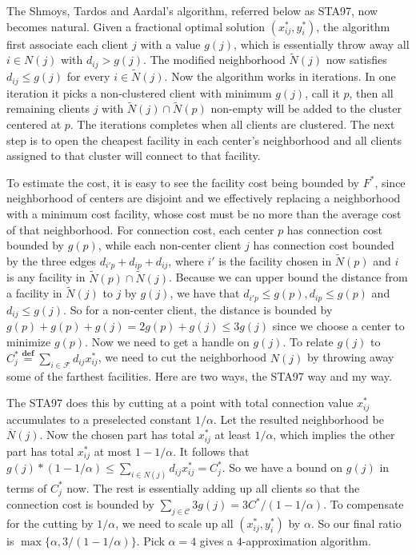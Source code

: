 \documentclass{article}
\newcommand{\fac}{\mathcal{F}}
\newcommand{\cli}{\mathcal{C}}
\newcommand{\wbar}{\overline}
\newcommand{\defeq}{\stackrel{\textbf{def}}{=}}
\begin{document}
The Shmoys, Tardos and Aardal's algorithm, referred below as STA97,
now becomes natural. Given a fractional optimal solution
$(x_{ij}^\ast, y_i^\ast)$, the algorithm first associate each client
$j$ with a value $g(j)$, which is essentially throw away all $i\in
N(j)$ with $d_{ij} > g(j)$. The modified neighborhood $\widetilde
N(j)$ now satisfies $d_{ij} \leq g(j)$ for every $i\in \widetilde
N(j)$. Now the algorithm works in iterations. In one iteration it
picks a non-clustered client with minimum $g(j)$, call it $p$, then
all remaining clients $j$ with $\widetilde N(j)\cap \widetilde N(p)$
non-empty will be added to the cluster centered at $p$. The iterations
completes when all clients are clustered. The next step is to open the
cheapest facility in each center's neighborhood and all clients
assigned to that cluster will connect to that facility.

To estimate the cost, it is easy to see the facility cost being
bounded by $F^\ast$, since neighborhood of centers are disjoint and we
effectively replacing a neighborhood with a minimum cost facility,
whose cost must be no more than the average cost of that
neighborhood. For connection cost, each center $p$ has connection cost
bounded by $g(p)$, while each non-center client $j$ has connection
cost bounded by the three edges $d_{i' p} + d_{ip} + d_{ij}$, where
$i'$ is the facility chosen in $\widetilde N(p)$ and $i$ is any
facility in $\widetilde N(p)\cap \widetilde N(j)$. Because we can
upper bound the distance from a facility in $\widetilde N(j)$ to $j$
by $g(j)$, we have that $d_{i' p} \leq g(p), d_{ip} \leq g(p)$ and
$d_{ij} \leq g(j)$. So for a non-center client, the distance is
bounded by $g(p) + g(p) + g(j) = 2g(p) + g(j) \leq 3g(j)$ since we
choose a center to minimize $g(p)$. Now we need to get a handle on
$g(j)$. To relate $g(j)$ to $C_j^\ast \defeq \sum_{i\in \fac}
d_{ij}x_{ij}^\ast$, we need to cut the neighborhood $N(j)$ by throwing
away some of the farthest facilities. Here are two ways, the STA97 way
and my way.

The STA97 does this by cutting at a point with total connection value
$x_{ij}^\ast$ accumulates to a preselected constant $1/\alpha$. Let
the resulted neighborhood be $\wbar N(j)$. Now the chosen part has
total $x_{ij}^\ast$ at least $1/\alpha$, which implies the other part
has total $x_{ij}^\ast$ at most $1-1/\alpha$. It follows that
$g(j)*(1-1/\alpha) \leq \sum_{i\in N(j)} d_{ij} x_{ij}^\ast =
C_j^\ast$. So we have a bound on $g(j)$ in terms of $C_j^\ast$
now. The rest is essentially adding up all clients so that the
connection cost is bounded by $\sum_{j\in\cli} 3g(j) =
3C^\ast/(1-1/\alpha)$. To compensate for the cutting by $1/\alpha$, we
need to scale up all $(x_{ij}^\ast, y_i^\ast)$ by $\alpha$. So our
final ratio is $\max\{\alpha, 3/(1-1/\alpha)\}$. Pick $\alpha=4$ gives
a $4$-approximation algorithm.
\end{document}
